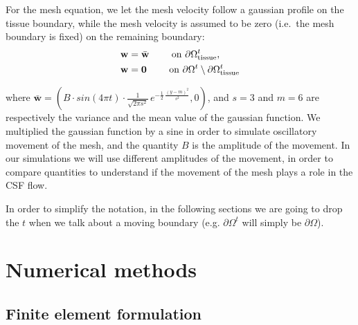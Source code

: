 \documentclass[a4paper,11pt,openright,twoside]{book}
\begin{document}
For the mesh equation, we let the mesh velocity follow a gaussian profile on the tissue boundary, while the mesh velocity is assumed to
be zero (i.e.~the mesh boundary is fixed) on the remaining boundary:
\begin{align}
\label{eq:bc:5}
\mathbf{w} &= \bar{\mathbf{w}}  \qquad \text{ on } \partial \Omega_{\rm tissue}^t,\\
\mathbf{w} &= \mathbf{0}  \qquad \text{ on } \partial \Omega^t \setminus \partial \Omega_{\rm tissue}^t
\end{align}

where $\bar{\mathbf{w}} = (B \cdot sin(4\pi t) \cdot \frac{1}{\sqrt{2 \pi s^2}} \, e^{- \frac{1}{2} \, \frac{(y - m)^2}{s^2}}  , 0)$, and $s = 3$ and $m = 6$ are respectively the variance and the mean value of the gaussian function. We multiplied the gaussian function by a sine in order to simulate oscillatory movement of the mesh, and the quantity $B$ is the amplitude of the movement. In our simulations we will use different amplitudes of the movement, in order to compare quantities to understand if the movement of the mesh plays a role in the CSF flow.

\begin{figure}


\end{figure}


In order to simplify the notation, in the following sections we are going to drop the $t$ when we talk about a moving boundary (e.g. $\partial \Omega^t$ will simply be $\partial \Omega$).




\chapter{Numerical methods}

\section{Finite element formulation}
\end{document}
